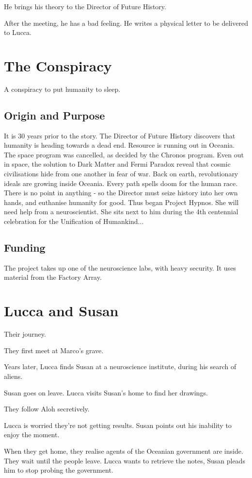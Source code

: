 \documentclass[11pt]{article}
\begin{document}
He brings his theory to the Director of Future History.

After the meeting, he has a bad feeling. He writes a physical letter to be delivered to Lucca. 


\section{The Conspiracy}
A conspiracy to put humanity to sleep.

	\subsection{Origin and Purpose}
	It is 30 years prior to the story. The Director of Future History discovers that humanity is heading towards a dead end. Resource is running out in Oceania. The space program was cancelled, as decided by the Chronos program. Even out in space, the solution to Dark Matter and Fermi Paradox reveal that cosmic civilisations hide from one another in fear of war. Back on earth, revolutionary ideals are growing inside Oceania. Every path spells doom for the human race. There is no point in anything - so the Director must seize history into her own hands, and euthanise humanity for good. Thus began Project Hypnos. She will need help from a neuroscientist. She sits next to him during the 4th centennial celebration for the Unification of Humankind...
	\subsection{Funding}
	The project takes up one of the neuroscience labs, with heavy security.
	It uses material from the Factory Array. 
	
\section{Lucca and Susan}
Their journey.

They first meet at Marco's grave. 

Years later, Lucca finds Susan at a neuroscience institute, during his search of aliens.

Susan goes on leave. Lucca visits Susan's home to find her drawings. 

They follow Aloh secretively.

Lucca is worried they're not getting results. Susan points out his inability to enjoy the moment.

When they get home, they realise agents of the Oceanian government are inside. They wait until the people leave. Lucca wants to retrieve the notes, Susan pleads him to stop probing the government.
\end{document}
